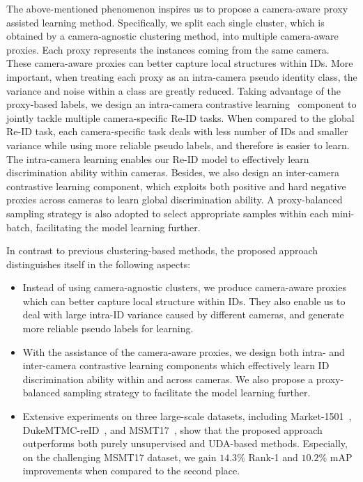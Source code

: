 \documentclass[letterpaper]{article} %
\begin{document}
The above-mentioned phenomenon inspires us to propose a camera-aware proxy assisted learning method. Specifically, we split each single cluster, which is obtained by a camera-agnostic clustering method, into multiple camera-aware proxies. Each proxy represents the instances coming from the same camera. These camera-aware proxies can better capture local structures within IDs. More important, when treating each proxy as an intra-camera pseudo identity class, the variance and noise within a class are greatly reduced. Taking advantage of the proxy-based labels, we design an intra-camera contrastive learning~\cite{Chen2020SimCLR} component to jointly tackle multiple camera-specific Re-ID tasks. When compared to the global Re-ID task, each camera-specific task deals with less number of IDs and smaller variance while using more reliable pseudo labels, and therefore is easier to learn. The intra-camera learning enables our Re-ID model to effectively learn discrimination ability within cameras. Besides, we also design an inter-camera contrastive learning component, which exploits both positive and hard negative proxies across cameras to learn global discrimination ability. A proxy-balanced sampling strategy is also adopted to select appropriate samples within each mini-batch, facilitating the model learning further.


In contrast to previous clustering-based methods, the proposed approach distinguishes itself in the following aspects:
\begin{itemize}
	\item Instead of using camera-agnostic clusters, we produce camera-aware proxies which can better capture local structure within IDs. They also enable us to deal with large intra-ID variance caused by different cameras, and generate more reliable pseudo labels for learning.
	\item With the assistance of the camera-aware proxies, we design both intra- and inter-camera contrastive learning components which effectively learn ID discrimination ability within and across cameras. We also propose a proxy-balanced sampling strategy to facilitate the model learning further.
	\item Extensive experiments on three large-scale datasets, including Market-1501~\cite{7410490}, DukeMTMC-reID~\cite{zheng2017unlabeled}, and MSMT17~\cite{wei2018person}, show that the proposed approach outperforms both purely unsupervised and UDA-based methods. Especially, on the challenging MSMT17 dataset, we gain $14.3\%$ Rank-1 and $10.2\%$ mAP improvements when compared to the second place.
\end{itemize}
\end{document}
